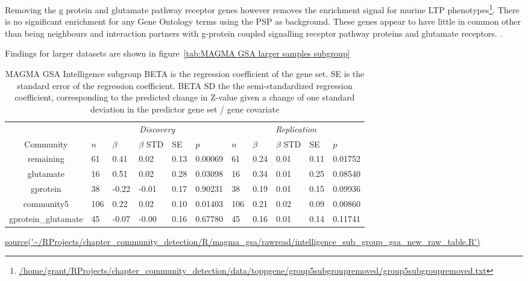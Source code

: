 Removing the g protein and glutamate pathway receptor genes however removes the enrichment signal for murine LTP phenotypes\footnote{\tiny\url{/home/grant/RProjects/chapter_community_detection/data/toppgene/group5subgroupremoved/group5subgroupremoved.txt}}. There is no significant enrichment for any Gene Ontology terms using the PSP as background. These genes appear to have little in common other than being neighbours and interaction partners with g-protein coupled signalling receptor pathway proteins and glutamate receptors. 
. 







Findings for larger datasets are shown in figure~\ref{tab:MAGMA GSA larger samples subgroup}
\begin{table}[ht]
\centering
\setlength{\extrarowheight}{2pt}
\begin{adjustbox}{width=\textwidth}
\begin{tabular}{cllllllllll}
  \toprule
   &  \multicolumn{5}{c}{\textit{Discovery}} & \multicolumn{5}{c}{\textit{Replication}} \\
    \cmidrule{2-11}
Community & $n$ & $\beta$ & $\beta$ STD & SE & $p$ & $n$ & $\beta$ & $\beta$ STD & SE & $p$\\ 
  \midrule
remaining & 61 & 0.41 & 0.02 & 0.13 & 0.00069 & 61 & 0.24 & 0.01 & 0.11 & 0.01752 \\ 
  glutamate & 16 & 0.51 & 0.02 & 0.28 & 0.03098 & 16 & 0.34 & 0.01 & 0.25 & 0.08540 \\ 
  gprotein & 38 & -0.22 & -0.01 & 0.17 & 0.90231 & 38 & 0.19 & 0.01 & 0.15 & 0.09936 \\ 
  community5 & 106 & 0.22 & 0.02 & 0.10 & 0.01403 & 106 & 0.21 & 0.02 & 0.09 & 0.00860 \\ 
  gprotein\_glutamate & 45 & -0.07 & -0.00 & 0.16 & 0.67780 & 45 & 0.16 & 0.01 & 0.14 & 0.11741 \\ 
   \bottomrule
  
\end{tabular}
\end{adjustbox}
\caption{MAGMA GSA Intelligence subgroup  BETA is the regression coefficient of the gene set. SE is the standard error of the regression coefficient. BETA SD the the semi-standardized regression coefficient, corresponding to the predicted
change in Z-value given a change of one standard deviation in the predictor gene set / gene covariate } 
\tiny\url{source('~/RProjects/chapter_community_detection/R/magma_gsa/rawread/intelligence_sub_group_gsa_new_raw_table.R')}
\label{tab:MAGMA GSA Intelligence sub}
\end{table}

